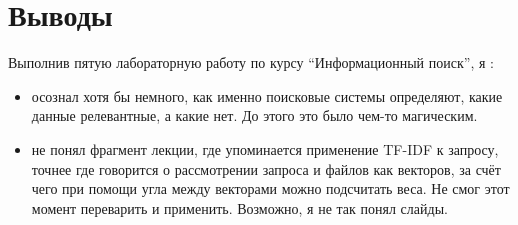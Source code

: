 \section{Выводы}

Выполнив пятую лабораторную работу по курсу \enquote{Информационный поиск}, я :
\begin{itemize}
    \item осознал хотя бы немного, как именно поисковые системы определяют, какие данные релевантные, а какие нет. До этого это было чем-то магическим.
    \item не понял фрагмент лекции, где упоминается применение TF-IDF к запросу, точнее где говорится о рассмотрении запроса и файлов как векторов, за счёт чего при помощи угла между векторами можно подсчитать веса. Не смог этот момент переварить и применить. Возможно, я не так понял слайды.
\end{itemize}
\pagebreak
